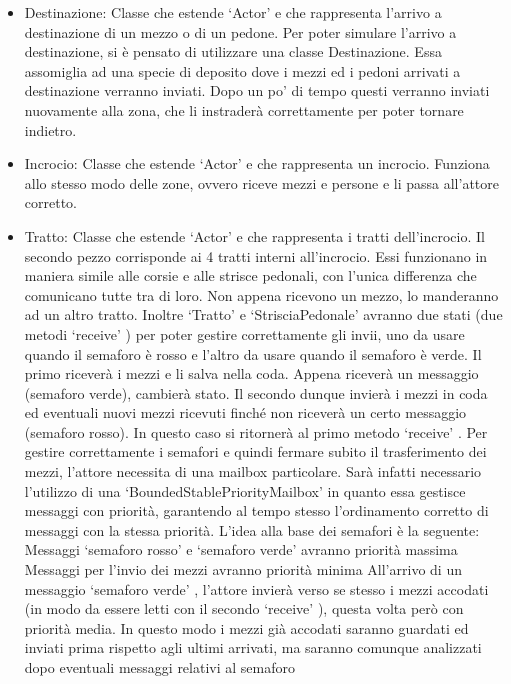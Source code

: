 \documentclass{article}
\begin{document}
\begin{itemize}
\item {Destinazione:}
Classe che estende \lq Actor\rq{} e che rappresenta l\textquoteright{}arrivo a destinazione di un mezzo o di un pedone. Per poter simulare l\textquoteright{}arrivo a destinazione, si \`{e} pensato di utilizzare una classe Destinazione. Essa assomiglia ad una specie di deposito dove i mezzi ed i pedoni arrivati a destinazione verranno inviati. Dopo un po\textquoteright{} di tempo questi verranno inviati nuovamente alla zona, che li instrader\`{a} correttamente per poter tornare indietro.
\item {Incrocio:}
Classe che estende \lq Actor\rq{} e che rappresenta un incrocio. Funziona allo stesso modo delle zone, ovvero riceve mezzi e persone e li passa all\textquoteright{}attore corretto.
\item {Tratto:}
Classe che estende \lq Actor\rq{} e che rappresenta i tratti dell\textquoteright{}incrocio. Il secondo pezzo corrisponde ai 4 tratti interni all\textquoteright{}incrocio. Essi funzionano in maniera simile alle corsie e alle strisce pedonali, con l\textquoteright{}unica differenza che comunicano tutte tra di loro. Non appena ricevono un mezzo, lo manderanno ad un altro tratto. 
Inoltre \lq Tratto\rq{} e \lq StrisciaPedonale\rq{} avranno due stati (due metodi \lq receive\rq{} ) per poter gestire correttamente gli invii, uno da usare quando il semaforo \`{e} rosso e l\textquoteright{}altro da usare quando il semaforo \`{e} verde. Il primo ricever\`{a} i mezzi e li salva nella coda. Appena ricever\`{a} un messaggio (semaforo verde), cambier\`{a} stato. Il secondo dunque invier\`{a} i mezzi in coda ed eventuali nuovi mezzi ricevuti finché non ricever\`{a} un certo messaggio (semaforo rosso). In questo caso si ritorner\`{a} al primo metodo \lq receive\rq{} .
Per gestire correttamente i semafori e quindi fermare subito il trasferimento dei mezzi, l\textquoteright{}attore necessita di una mailbox particolare. Sar\`{a} infatti necessario l\textquoteright{}utilizzo di una \lq BoundedStablePriorityMailbox\rq{} in quanto essa gestisce messaggi con priorit\`{a}, garantendo al tempo stesso l\textquoteright{}ordinamento corretto di messaggi con la stessa priorit\`{a}. 
L\textquoteright{}idea alla base dei semafori \`{e} la seguente: 
Messaggi \lq semaforo rosso\rq{} e \lq semaforo verde\rq{} avranno priorit\`{a} massima
Messaggi per l\textquoteright{}invio dei mezzi avranno priorit\`{a} minima
All\textquoteright{}arrivo di un messaggio \lq semaforo verde\rq{} , l\textquoteright{}attore invier\`{a} verso se stesso i mezzi accodati (in modo da essere letti con il secondo \lq receive\rq{} ), questa volta per\`{o} con priorit\`{a} media. In questo modo i mezzi gi\`{a} accodati saranno guardati ed inviati prima rispetto agli ultimi arrivati, ma saranno comunque analizzati dopo eventuali messaggi relativi al semaforo

\end{itemize}
\end{document}
